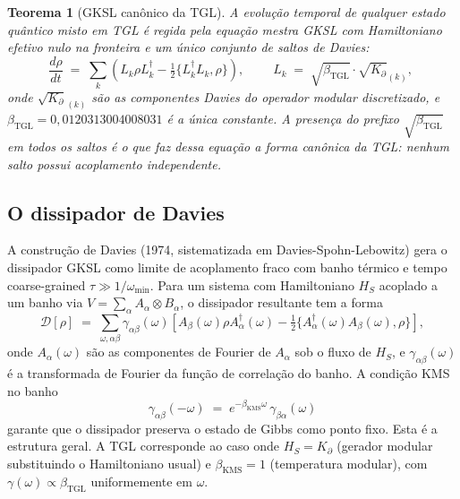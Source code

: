\documentclass[12pt,a4paper]{article}
\newtheorem{theorem}{Teorema}
\newcommand{\betatgl}{\beta_{\text{TGL}}}
\newcommand{\Kpartial}{K_{\partial}}
\newcommand{\TGL}{\textsc{TGL}}
\begin{document}
\begin{theorem}[GKSL canônico da \TGL{}]
\label{th:gksl}
A evolução temporal de qualquer estado quântico misto em \TGL{} é regida
pela equação mestra GKSL com Hamiltoniano efetivo nulo na fronteira e
\emph{um único conjunto de saltos de Davies}:
\begin{equation}
\frac{d\rho}{dt} \;=\; \sum_{k}
\left( L_k \rho L_k^{\dagger}
- \tfrac{1}{2}\{ L_k^{\dagger} L_k , \rho \} \right),
\qquad
\boxed{\; L_k \;=\; \sqrt{\betatgl} \cdot \sqrt{\Kpartial}_{(k)}, \;}
\label{eq:Lk-canonical}
\end{equation}
onde $\sqrt{\Kpartial}_{(k)}$ são as componentes Davies do operador modular
discretizado, e $\betatgl = 0{,}0120313004008031$ é a única constante.
A presença do prefixo $\sqrt{\betatgl}$ em \emph{todos} os saltos é o que
faz dessa equação a forma canônica da \TGL{}: nenhum salto possui
acoplamento independente.
\end{theorem}

\subsection{O dissipador de Davies}
\label{sec:davies-dissipator}

A construção de Davies (1974, sistematizada em Davies-Spohn-Lebowitz)
gera o dissipador GKSL como limite de acoplamento fraco com banho térmico
e tempo coarse-grained $\tau \gg 1/\omega_{\min}$.  Para um sistema com
Hamiltoniano $H_S$ acoplado a um banho via $V = \sum_{\alpha} A_{\alpha}
\otimes B_{\alpha}$, o dissipador resultante tem a forma
\begin{equation}
\mathcal{D}[\rho] \;=\;
\sum_{\omega, \alpha\beta}
\gamma_{\alpha\beta}(\omega) \left[
A_{\beta}(\omega) \rho A_{\alpha}^{\dagger}(\omega)
- \tfrac{1}{2} \{ A_{\alpha}^{\dagger}(\omega) A_{\beta}(\omega), \rho \}
\right],
\label{eq:dissipator-davies}
\end{equation}
onde $A_{\alpha}(\omega)$ são as componentes de Fourier de $A_{\alpha}$ sob
o fluxo de $H_S$, e $\gamma_{\alpha\beta}(\omega)$ é a transformada de
Fourier da função de correlação do banho.  A condição KMS no banho
\begin{equation}
\gamma_{\alpha\beta}(-\omega) \;=\; e^{-\beta_{\text{KMS}}\omega}\,
\gamma_{\beta\alpha}(\omega)
\label{eq:KMS-condition}
\end{equation}
garante que o dissipador preserva o estado de Gibbs como ponto fixo.  Esta
é a estrutura geral.  A \TGL{} corresponde ao caso onde $H_S = \Kpartial$
(gerador modular substituindo o Hamiltoniano usual) e
$\beta_{\text{KMS}} = 1$ (temperatura modular), com
$\gamma(\omega) \propto \betatgl$ uniformemente em $\omega$.
\end{document}
